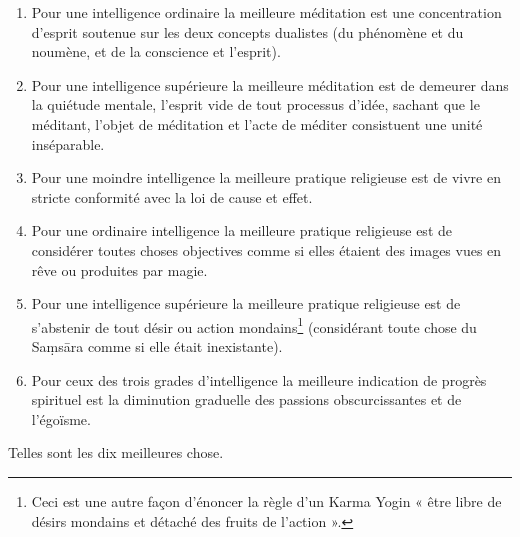 \documentclass[10pt]{book}
\begin{document}
\begin{enumerate}[1.-]
\item Pour une intelligence ordinaire la meilleure méditation est une concentration d'esprit soutenue sur les deux concepts dualistes (du phénomène et du noumène, et de la conscience et l'esprit).
\item Pour une intelligence supérieure la meilleure méditation est de demeurer dans la quiétude mentale, l'esprit vide de tout processus d'idée, sachant que le méditant, l'objet de méditation et l'acte de méditer consistuent une unité inséparable.
\item Pour une moindre intelligence la meilleure pratique religieuse est de vivre en stricte conformité avec la loi de cause et effet.
\item Pour une ordinaire intelligence la meilleure pratique religieuse est de considérer toutes choses objectives comme si elles étaient des images vues en rêve ou produites par magie.
\item Pour une intelligence supérieure la meilleure pratique religieuse est de s'abstenir de tout désir ou action mondains\footnote{Ceci est une autre façon d'énoncer la règle d'un Karma Yogin « être libre de désirs mondains et détaché des fruits de l'action ».} (considérant toute chose du Saṃsāra comme si elle était inexistante).
\item Pour ceux des trois grades d'intelligence la meilleure indication de progrès spirituel est la diminution graduelle des passions obscurcissantes et de l'égoïsme.
\end{enumerate}
Telles sont les dix meilleures chose.
\end{document}
